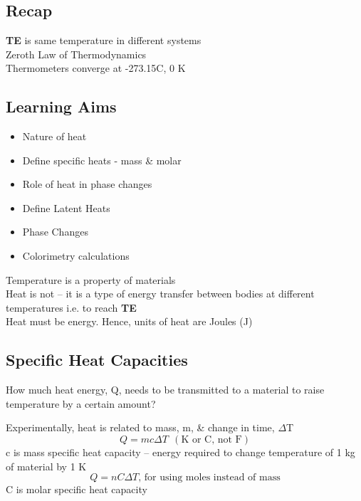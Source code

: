 \documentclass[a4paper, 11pt, fleqn, normalem]{report}
\begin{document}
\chapter{}
\thispagestyle{fancy}
\section{Recap}
\textbf{TE} is same temperature in different systems \\
Zeroth Law of Thermodynamics \\
Thermometers converge at -273.15{\textdegree}C, 0 K

\section{Learning Aims}
\begin{itemize}
    \item Nature of heat
    \item Define specific heats - mass \& molar
    \item Role of heat in phase changes
    \item Define Latent Heats
    \item Phase Changes
    \item Colorimetry calculations
\end{itemize}
Temperature is a property of materials \\
Heat is not -- it is a type of energy transfer between bodies at different temperatures i.e. to reach \textbf{TE} \\
Heat must be energy. Hence, units of heat are Joules (J)

\section{Specific Heat Capacities}
How much heat energy, Q, needs to be transmitted to a material to raise temperature by a certain amount?

Experimentally, heat is related to mass, m, \& change in time, ${\Delta}$T
\begin{equation*}
    Q = mc{\Delta}T ~~(\text{K or C, not F})
\end{equation*}
c is mass specific heat capacity -- energy required to change temperature of 1 kg of material by 1 K
\begin{equation*}
    Q = nC{\Delta}T\text{, for using moles instead of mass}
\end{equation*}
C is molar specific heat capacity
\end{document}
